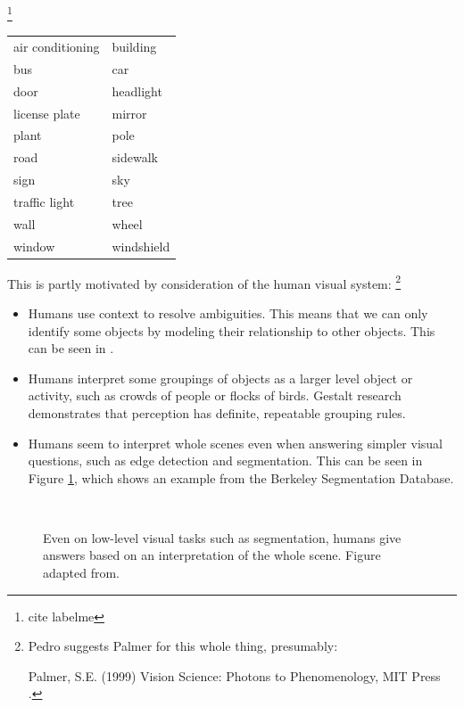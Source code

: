  \footnote{cite labelme}

\begin{tabular}{l l}
air conditioning & building\\
bus & car\\
door & headlight\\
license plate & mirror\\
plant & pole\\
road & sidewalk\\
sign & sky\\
traffic light & tree\\
wall & wheel\\
window & windshield\\
\end{tabular}

This is partly motivated by consideration of the human visual system:
\footnote{Pedro suggests Palmer for this whole thing, presumably:

  Palmer, S.E. (1999) Vision Science: Photons to Phenomenology, MIT
  Press .}  
\begin{itemize}
\item Humans use context to resolve ambiguities. \cite{visual-context}
  This means that we can only identify some objects by modeling their
  relationship to other objects. This can be seen in \cite{pop}.
\item Humans interpret some groupings of objects as a larger level
  object or activity, such as crowds of people or flocks of birds.
  Gestalt research demonstrates that perception has definite,
  repeatable grouping rules. \cite{gestalt}
\item Humans seem to interpret whole scenes even when answering
  simpler visual questions, such as edge detection and segmentation.
  This can be seen in Figure \ref{fig-bsd}, which shows an example
  from the Berkeley Segmentation Database. \cite{bsd}
\end{itemize}
\begin{figure}
  \centering
{}\\
\caption{Even on low-level visual tasks such as segmentation, humans
  give answers based on an interpretation of the whole scene. Figure
  adapted from.}
\label{fig-bsd}
\end{figure}

